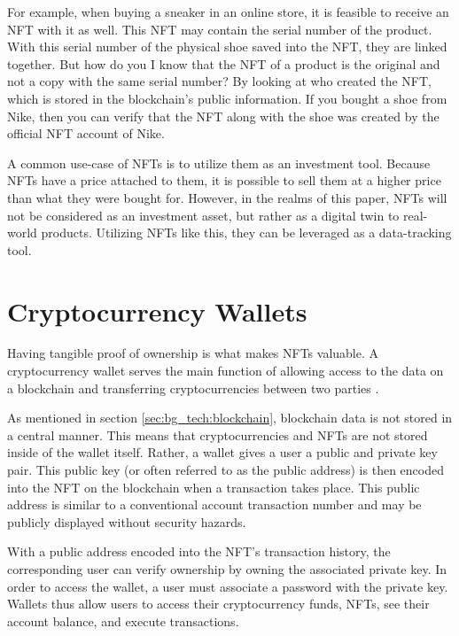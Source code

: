 
For example, when buying a sneaker in an online store, it is feasible to receive an NFT with it as well. This NFT may contain the serial number of the product. With this serial number of the physical shoe saved into the NFT, they are linked together. But how do you I know that the NFT of a product is the original and not a copy with the same serial number? By looking at who created the NFT, which is stored in the blockchain's public information. If you bought a shoe from Nike, then you can verify that the NFT along with the shoe was created by the official NFT account of Nike.

A common use-case of NFTs is to utilize them as an investment tool. Because NFTs have a price attached to them, it is possible to sell them at a higher price than what they were bought for. However, in the realms of this paper, NFTs will not be considered as an investment asset, but rather as a digital twin to real-world products. Utilizing NFTs like this, they can be leveraged as a data-tracking tool.

%
%
\section{Cryptocurrency Wallets}
\label{sec:bg_tech:wallets}

Having tangible proof of ownership is what makes NFTs valuable. A cryptocurrency wallet serves the main function of allowing access to the data on a blockchain and transferring cryptocurrencies between two parties \cite{wallets1}.

As mentioned in section \ref{sec:bg_tech:blockchain}, blockchain data is not stored in a central manner. This means that cryptocurrencies and NFTs are not stored inside of the wallet itself. Rather, a wallet gives a user a public and private key pair. This public key (or often referred to as the public address) is then encoded into the NFT on the blockchain when a transaction takes place. This public address is similar to a conventional account transaction number and may be publicly displayed without security hazards.

With a public address encoded into the NFT's transaction history, the corresponding user can verify ownership by owning the associated private key. In order to access the wallet, a user must associate a password with the private key. Wallets thus allow users to access their cryptocurrency funds, NFTs, see their account balance, and execute transactions. \cite{wallets2}


